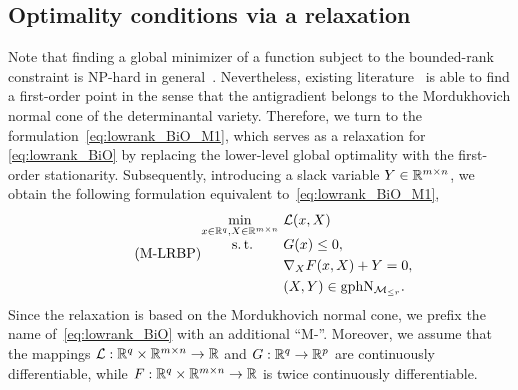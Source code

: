 \subsection{Optimality conditions via a relaxation}
Note that finding a global minimizer of a function subject to the bounded-rank constraint is NP-hard in general~\cite{gillis2011NPlowrank}. Nevertheless, existing literature~\cite{schneider2015Lojaconvergence,levin2023remedy,olikier2023RFDR} is able to find a first-order point in the sense that the antigradient belongs to the Mordukhovich normal cone of the determinantal variety. Therefore, we turn to the formulation~\eqref{eq:lowrank_BiO_M1}, which serves as a relaxation for \eqref{eq:lowrank_BiO} by replacing the lower-level global optimality with the first-order stationarity. Subsequently, introducing a slack variable $Y\in\mathbb{R}^{m\times n}$, we obtain the following formulation equivalent to~\eqref{eq:lowrank_BiO_M1},
\begin{equation}\label{eq:lowrank_BiO_M}\tag{M-LRBP}
\begin{aligned}
    \min_{x\in\mbR^q,X\in\mbR^{m\times n}}&\ \lanifold(x,X)\\[-1.5mm]
    \mathrm{s.\,t.}\ \ \ \ \ \,&\ G(x)\le 0,
        \\
        &\ \nabla_X F(x,X)+Y=0,
        \\
        &\ (X,Y)\in\graph \Lnormal_{\boundedrank}.
    \end{aligned}
\end{equation}
Since the relaxation is based on the Mordukhovich normal cone, we prefix the name of~\eqref{eq:lowrank_BiO} with an additional ``M-''. Moreover, we assume that the mappings $\mathcal{L}:\mathbb{R}^q\times\mathbb{R}^{m\times n}\to\mathbb{R}$ and $G:\mathbb{R}^q\to\mathbb{R}^p$ are continuously differentiable, while $F:\mathbb{R}^q\times\mathbb{R}^{m\times n}\to\mathbb{R}$ is twice continuously differentiable.

